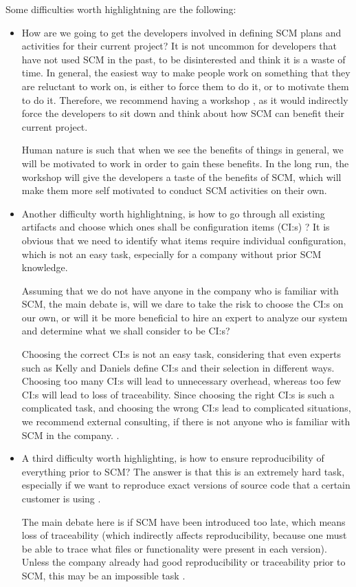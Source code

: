 \documentclass[10pt]{article}
\begin{document}
Some difficulties worth highlightning are the following:
\begin{itemize}
\item How are we going to get the developers involved in defining SCM plans and activities for their current project? It is not uncommon for developers that have not used SCM in the past, to be disinterested and think it is a waste of time. In general, the easiest way to make people work on something that they are reluctant to work on, is either to force them to do it, or to motivate them to do it. Therefore, we recommend having a workshop \cite{Vinter}, as it would indirectly force the developers to sit down and think about how SCM can benefit their current project. 

\noindent Human nature is such that when we see the benefits of things in general, we will be motivated to work in order to gain these benefits. In the long run, the workshop will give the developers a taste of the benefits of SCM, which will make them more self motivated to conduct SCM activities on their own. 

\item Another difficulty worth highlightning, is how to go through all existing artifacts and choose which ones shall be configuration items (CI:s) \cite{Kelly2}? It is obvious that we need to identify what items require individual configuration, which is not an easy task, especially for a company without prior SCM knowledge. 

\noindent Assuming that we do not have anyone in the company who is familiar with SCM, the main debate is, will we dare to take the risk to choose the CI:s on our own, or will it be more beneficial to hire an expert to analyze our system and determine what we shall consider to be CI:s? 

Choosing the correct CI:s is not an easy task, considering that even experts such as Kelly\cite{Kelly2} and Daniels\cite{Daniels3} define CI:s and their selection in different ways. Choosing too many CI:s will lead to unnecessary overhead, whereas too few CI:s will lead to loss of traceability\cite{Daniels3}. Since choosing the right CI:s is such a complicated task\cite{Daniels3}\cite{Kelly2}, and choosing the wrong CI:s lead to complicated situations\cite{Daniels3}, we recommend external consulting, if there is not anyone who is familiar with SCM in the company. .

\item A third difficulty worth highlighting, is how to ensure reproducibility of everything prior to SCM? The answer is that this is an extremely hard task, especially if we want to reproduce exact versions of source code that a certain customer is using \cite{Appleton2}.

\noindent The main debate here is if SCM have been introduced too late, which means loss of traceability \cite{Kelly} (which indirectly affects reproducibility, because one must be able to trace what files or functionality were present in each version). Unless the company already had good reproducibility or traceability prior to SCM, this may be an impossible task \cite{Bays}. 

\end{itemize}
\end{document}

